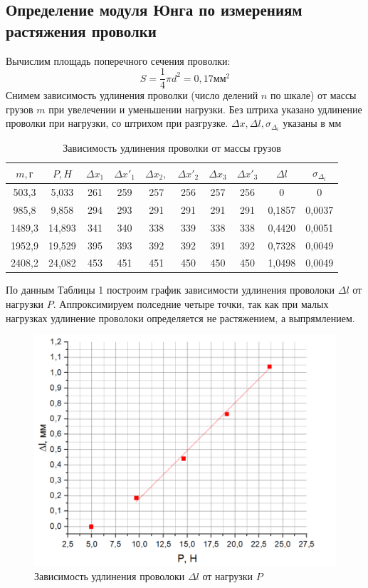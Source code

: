 \documentclass[a4paper,12pt]{article} %
\begin{document}
\subsection{Определение модуля Юнга по измерениям растяжения проволки}
Вычислим площадь поперечного сечения проволки:
\[S = \frac{1}{4}\pi d^2 = 0,17\text{мм}^2\]
Снимем зависимость удлинения проволки (число делений $n$ по шкале) от массы грузов $m$ при увелечении и уменьшении нагрузки. Без штриха указано удлинение проволки при нагрузки, со штрихом при разгрузке. $\Delta x, \Delta l, \sigma_{\Delta_l}$ указаны в $\text{мм}$
\begin{table}[h]
\centering
\begin{tabular}{|c|c|c|c|c|c|c|c|c|c|}
\hline
$m,\text{г} $   & $P, H$ & $\Delta x_1$   & $\Delta x'_1$  & $\Delta x_2,$   & $\Delta x'_2$  & $\Delta x_3$   & $\Delta x'_3$ & $\Delta l$ & $\sigma_{\Delta_l}$  \\ \hline
503,3  & 5,033  & 261 & 259 & 257 & 256 & 257 & 256 & 0      & 0      \\ \hline
985,8  & 9,858  & 294 & 293 & 291 & 291 & 291 & 291 & 0,1857 & 0,0037 \\ \hline
1489,3 & 14,893 & 341 & 340   & 338 & 339 & 338 & 338 & 0,4420 & 0,0051 \\ \hline
1952,9 & 19,529 & 395 & 393 & 392 & 392 & 391 & 392 & 0,7328 & 0,0049 \\ \hline
2408,2 & 24,082 & 453 & 451 & 451 & 450   & 450   & 450   & 1,0498 & 0,0049 \\ \hline
\end{tabular}
\caption{Зависимость удлинения проволки от массы грузов}
\end{table}
По данным Таблицы 1 построим график зависимости удлинения проволоки $\Delta l$ от нагрузки $P$. Аппроксимируем полседние четыре точки, так как при малых нагрузках удлинение проволоки определяется не растяжением, а выпрямлением.
\begin{figure}[h]
\centering
\includegraphics[scale=0.4]{5}
\caption{Зависимость удлинения проволоки $\Delta l$ от нагрузки $P$}
\end{figure}
\end{document}
